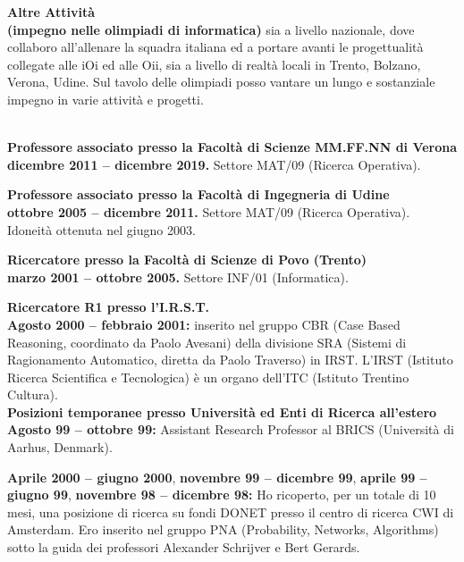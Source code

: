 \documentclass[10pt]{article}
\newcommand{\voice}[1] { \bigskip \medskip \noindent {\Large \bf #1} \medskip\\ }
\newcommand{\subvoice}[1] { {\large \bf #1} \smallskip\\ }
\begin{document}
\subvoice{Altre Attivit\`a}
\indent
{\bf (impegno nelle olimpiadi di informatica)}
sia a livello nazionale, dove collaboro all'allenare la squadra italiana
ed a portare avanti le progettualit\`a collegate alle iOi ed alle Oii,
sia a livello di realt\`a locali in Trento, Bolzano, Verona, Udine.
Sul tavolo delle olimpiadi posso vantare un lungo e sostanziale impegno in varie attivit\`a e progetti. 


\vspace{1.8mm}

\voice{{\LARGE Esperienze di lavoro}}

\subvoice{Professore associato presso la
          Facolt\`a di Scienze MM.FF.NN di Verona}
{\bf dicembre 2011 -- dicembre 2019.}
Settore MAT/09 (Ricerca Operativa).


\subvoice{Professore associato presso la
          Facolt\`a di Ingegneria di Udine}
{\bf ottobre 2005 -- dicembre 2011.}
Settore MAT/09 (Ricerca Operativa).
Idoneit\`a ottenuta nel giugno 2003.


\subvoice{Ricercatore presso la
          Facolt\`a di Scienze di Povo (Trento)}
{\bf marzo 2001 -- ottobre 2005.}
Settore INF/01 (Informatica).


\subvoice{Ricercatore R1 presso l'I.R.S.T.}
{\bf Agosto 2000 -- febbraio 2001:}
inserito nel gruppo CBR (Case Based Reasoning, coordinato da Paolo Avesani)
della divisione SRA
(Sistemi di Ragionamento Automatico, diretta da Paolo Traverso) in IRST.
L'IRST (Istituto Ricerca Scientifica e Tecnologica)
\`e un organo dell'ITC (Istituto Trentino Cultura).\\

\subvoice{Posizioni temporanee presso Universit\`a ed Enti di Ricerca all'estero}
{\bf Agosto 99 -- ottobre 99:}
     Assistant Research Professor
     al  BRICS (Universit\`a di Aarhus, Denmark). 

\noindent
{\bf Aprile 2000 -- giugno 2000},
{\bf novembre 99 -- dicembre 99},
{\bf aprile 99 -- giugno 99},
{\bf novembre 98 -- dicembre 98:}
      Ho ricoperto, per un totale di 10 mesi,
      una posizione di ricerca su fondi DONET
      presso il centro di ricerca CWI di Amsterdam.
      Ero inserito nel gruppo PNA (Probability, Networks, Algorithms)
      sotto la guida dei professori Alexander Schrijver
      e Bert Gerards.\\
\end{document}
